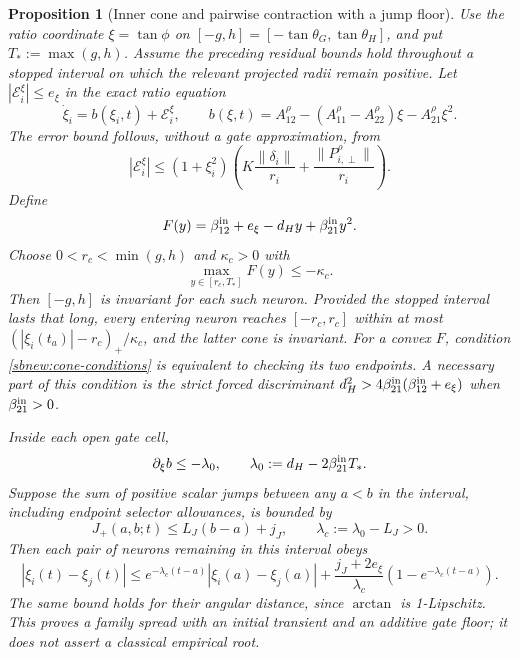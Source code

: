 \documentclass{article} %
\theoremstyle{plain}
\newtheorem{proposition}[theorem]{Proposition}
\theoremstyle{definition}
\theoremstyle{remark}
\begin{document}
\begin{proposition}[Inner cone and pairwise contraction with a jump floor]
\label{sbnew:inner}
Use the ratio coordinate $\xi=\tan\phi$ on
$[-g,h]=[-\tan\theta_G,\tan\theta_H]$, and put $T_*:=\max(g,h)$.
Assume the preceding residual bounds hold throughout a stopped interval
on which the relevant projected radii remain positive.
Let $|\mathcal E_i^\xi|\le e_\xi$ in the exact ratio equation
\begin{equation}\label{sbnew:ratio}
 \dot\xi_i=b(\xi_i,t)+\mathcal E_i^\xi,\qquad
 b(\xi,t)=A_{12}^\rho-(A_{11}^\rho-A_{22}^\rho)\xi-A_{21}^\rho\xi^2.
\end{equation}
The error bound follows, without a gate approximation, from
\begin{equation}\label{sbnew:ratio-error}
 |\mathcal E_i^\xi|\le
 (1+\xi_i^2)
 \left(K\frac{\|\delta_i\|}{r_i}+
                  \frac{\|P_{i,\perp}^\rho\|}{r_i}\right).
\end{equation}
Define
\[
 F(y)=\beta_{12}^{\rm in}+e_\xi-d_Hy+\beta_{21}^{\rm in}y^2.
\]
Choose $0<r_c<\min(g,h)$ and $\kappa_c>0$ with
\begin{equation}\label{sbnew:cone-conditions}
 \max_{y\in[r_c,T_*]}F(y)\le-\kappa_c.
\end{equation}
Then $[-g,h]$ is invariant for each such neuron. Provided the stopped
interval lasts that long, every entering neuron reaches $[-r_c,r_c]$ within at most
$(|\xi_i(t_a)|-r_c)_+/\kappa_c$, and the latter cone is invariant.
For a convex $F$, condition \eqref{sbnew:cone-conditions} is equivalent to
checking its two endpoints. A necessary part of this condition is the
strict forced discriminant
$d_H^2>4\beta_{21}^{\rm in}(\beta_{12}^{\rm in}+e_\xi)$ when
$\beta_{21}^{\rm in}>0$.

Inside each open gate cell,
\begin{equation}\label{sbnew:cell-contract}
 \partial_\xi b\le-\lambda_0,
 \qquad \lambda_0:=d_H-2\beta_{21}^{\rm in}T_*.
\end{equation}
Suppose the sum of positive scalar jumps between any $a<b$ in the interval,
including endpoint selector allowances, is bounded by
\begin{equation}\label{sbnew:jump-modulus}
 J_+(a,b;t)\le L_J(b-a)+j_J,
 \qquad\lambda_c:=\lambda_0-L_J>0.
\end{equation}
Then each pair of neurons remaining in this interval obeys
\begin{equation}\label{sbnew:pairwise}
 |\xi_i(t)-\xi_j(t)|\le
 e^{-\lambda_c(t-a)}|\xi_i(a)-\xi_j(a)|
 +\frac{j_J+2e_\xi}{\lambda_c}(1-e^{-\lambda_c(t-a)}).
\end{equation}
The same bound holds for their angular distance, since $\arctan$ is
1-Lipschitz. This proves a family spread with an initial transient and an
additive gate floor; it does not assert a classical empirical root.
\end{proposition}
\end{document}
